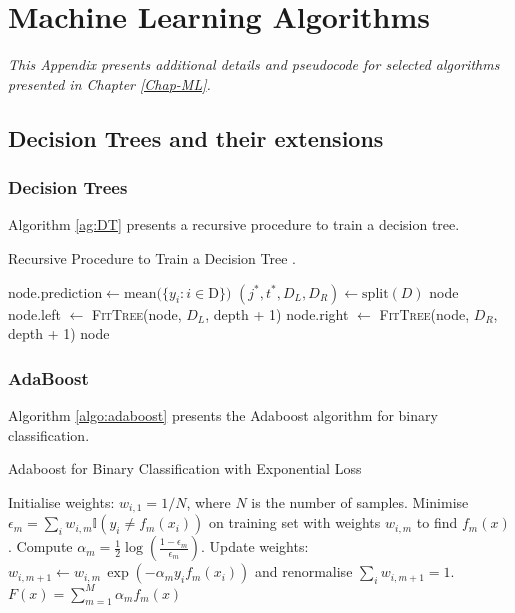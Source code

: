 \chapter{Machine Learning Algorithms}\label{app:MLalgo}
\ChapFrame

\textit{This Appendix presents additional details and pseudocode for selected algorithms presented in Chapter \ref{Chap-ML}.}

\section{Decision Trees and their extensions}
\subsection{Decision Trees}\label{app:dtalgo}
Algorithm \ref{ag:DT} presents a recursive procedure to train a decision tree. 
\begin{algorithm}
    \caption{Recursive Procedure to Train a Decision Tree \cite{MurphyML}.}
    \begin{algorithmic}
        \State $\text{node.prediction} \gets \text{mean}(\{y_i : i \in $D$\})$ 
        \State $(j^*, t^*, D_L, D_R) \gets \text{split}(D)$
            \State \Return node
        \Else
            \State node.left $\gets$ \textsc{FitTree}(node, $D_L$, depth + 1)
            \State node.right $\gets$ \textsc{FitTree}(node, $D_R$, depth + 1)
            \State \Return node
        \EndIf
    \EndFunction
    \end{algorithmic}
    \label{ag:DT}
\end{algorithm}

\subsection{AdaBoost}
Algorithm \ref{algo:adaboost} presents the Adaboost algorithm for binary classification. 
\begin{algorithm}
    \caption{Adaboost for Binary Classification with Exponential Loss \cite{MurphyML}}
    \label{algo:adaboost}
    \begin{algorithmic}
    \State Initialise weights: $w_{i,1} = 1/N$, where $N$ is the number of samples.
        \State Minimise $\epsilon_m = \sum_i w_{i,m} \mathbb{I}(y_i \neq f_m(x_i))$ on training set with weights $w_{i,m}$ to find $f_m(x)$.
        \State Compute $\alpha_m = \frac{1}{2} \log\left(\frac{1 - \epsilon_m}{\epsilon_m}\right)$.
        \State Update weights: $w_{i,m+1} \leftarrow w_{i,m} \, \exp(-\alpha_m y_i f_m(x_i))$ and renormalise $\sum_i w_{i, m+1} = 1$.
    \EndFor
    \State \Return $F(x) = \sum_{m=1}^M \alpha_m f_m(x)$
    \end{algorithmic}
\end{algorithm}

